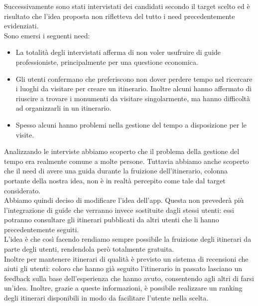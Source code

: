 Successivamente sono stati intervistati dei candidati secondo il target scelto ed è risultato che l'idea proposta non rifletteva del tutto i need precedentemente evidenziati. \\ Sono emersi i seguenti need:
\begin{itemize}
	\item La totalità degli intervistati afferma di non voler usufruire di guide professioniste, principalmente per una questione economica.
	\item Gli utenti confermano che preferiscono non dover perdere tempo nel ricercare i luoghi da visitare per creare un itinerario. Inoltre alcuni hanno affermato di riuscire a trovare i monumenti da visitare singolarmente, ma hanno difficoltà ad organizzarli in un itinerario.
	\item Spesso alcuni hanno problemi nella gestione del tempo a disposizione per le visite.
\end{itemize}
Analizzando le interviste abbiamo scoperto che il problema della gestione del tempo era realmente comune a molte persone. Tuttavia abbiamo anche scoperto che il need di avere una guida durante la fruizione dell'itinerario, colonna portante della nostra idea, non
è in realtà percepito come tale dal target considerato. \\

Abbiamo quindi deciso di modificare l'idea dell'app. Questa non prevederà più l'integrazione di guide che verranno invece sostituite dagli stessi utenti: essi potranno consultare gli itinerari pubblicati da altri utenti che li hanno precedentemente seguiti. \\

L'idea è che così facendo rendiamo sempre possibile la fruizione degli itinerari da parte degli utenti, rendendola però totalmente gratuita. \\

Inoltre per mantenere itinerari di qualità è previsto un sistema di recensioni che aiuti gli utenti: coloro che hanno già seguito l'itinerario in passato lasciano un feedback sulla base dell'esperienza che hanno avuto, consentendo agli altri di farsi un'idea. Inoltre, grazie a queste informazioni, è possibile realizzare un ranking degli itinerari disponibili in modo da facilitare l'utente nella scelta.\\



